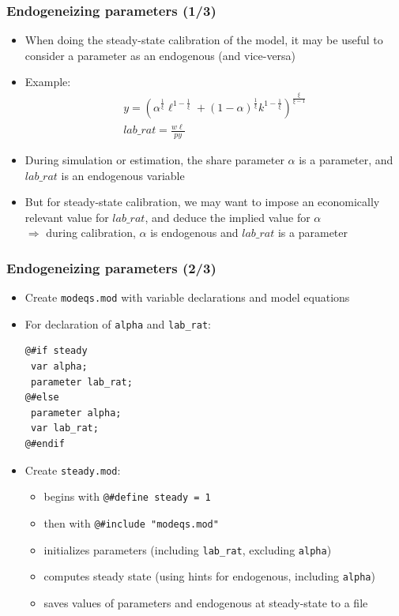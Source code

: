 \documentclass{beamer}
\begin{document}
\begin{frame}
  \frametitle{Endogeneizing parameters (1/3)}
  \begin{itemize}
  \item When doing the steady-state calibration of the model, it may be useful to consider a parameter as an endogenous (and vice-versa)
  \item Example:
    \begin{gather*}
      y = \left(\alpha^{\frac{1}{\xi}} \ell^{1-\frac{1}{\xi}} + (1-\alpha)^{\frac{1}{\xi}}k^{1-\frac{1}{\xi}}\right)^{\frac{\xi}{\xi - 1}} \\
      lab\_rat = \frac{w \ell}{p y}
    \end{gather*}
  \item During simulation or estimation, the share parameter $\alpha$ is a parameter, and $lab\_rat$ is an endogenous variable
  \item But for steady-state calibration, we may want to impose an economically relevant value for $lab\_rat$, and deduce the implied value for $\alpha$ \\
    $\Rightarrow$ during calibration, $\alpha$ is endogenous and $lab\_rat$ is a parameter
  \end{itemize}
\end{frame}

\begin{frame}[fragile=singleslide]
  \frametitle{Endogeneizing parameters (2/3)}
  \begin{itemize}
  \item Create \texttt{modeqs.mod} with variable declarations and model equations
  \item For declaration of \texttt{alpha} and \texttt{lab\_rat}:
    \footnotesize
\begin{verbatim}
@#if steady
 var alpha;
 parameter lab_rat;
@#else
 parameter alpha;
 var lab_rat;
@#endif
\end{verbatim}
    \normalsize
  \item Create \texttt{steady.mod}:
    \begin{itemize}
    \item begins with \verb+@#define steady = 1+
    \item then with \verb+@#include "modeqs.mod"+
    \item initializes parameters (including \texttt{lab\_rat}, excluding \texttt{alpha})
    \item computes steady state (using hints for endogenous, including \texttt{alpha})
    \item saves values of parameters and endogenous at steady-state to a file
    \end{itemize}
  \end{itemize}
\end{frame}
\end{document}
